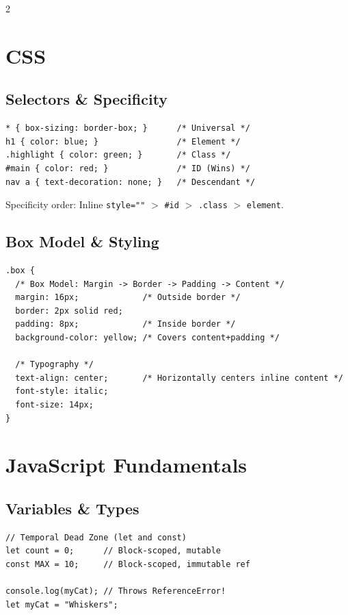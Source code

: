 \documentclass{article}
\begin{document}
\begin{multicols}{2}
\columnbreak

\section{CSS}

\subsection{Selectors \& Specificity}
\begin{lstlisting}[style=cssexam]
* { box-sizing: border-box; }      /* Universal */
h1 { color: blue; }                /* Element */
.highlight { color: green; }       /* Class */
#main { color: red; }              /* ID (Wins) */
nav a { text-decoration: none; }   /* Descendant */
\end{lstlisting}
Specificity order: Inline \texttt{style=""} $>$ \texttt{\#id} $>$ \texttt{.class} $>$ \texttt{element}.

\subsection{Box Model \& Styling}
\begin{lstlisting}[style=cssexam]
.box {
  /* Box Model: Margin -> Border -> Padding -> Content */
  margin: 16px;             /* Outside border */
  border: 2px solid red;
  padding: 8px;             /* Inside border */
  background-color: yellow; /* Covers content+padding */

  /* Typography */
  text-align: center;       /* Horizontally centers inline content */
  font-style: italic;
  font-size: 14px;
}
\end{lstlisting}

\columnbreak

\section{JavaScript Fundamentals}

\subsection{Variables \& Types}
\begin{lstlisting}[style=jsexam]
// Temporal Dead Zone (let and const)
let count = 0;      // Block-scoped, mutable
const MAX = 10;     // Block-scoped, immutable ref

console.log(myCat); // Throws ReferenceError!
let myCat = "Whiskers";


\end{lstlisting}
\end{multicols}
\end{document}
